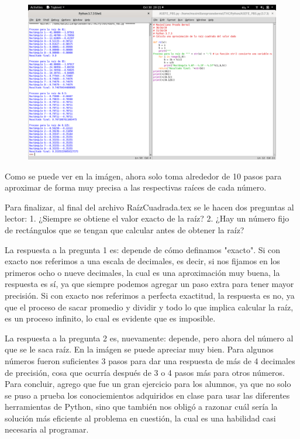 \documentclass[]{article}
\begin{document}
\begin{figure}[H]
	\centering
	\includegraphics[width=1.02\linewidth]{"Imagenes/Captura 7"}
	\caption{}
	\label{fig:captura-7}
\end{figure}
Como se puede ver en la imágen, ahora solo toma alrededor de 10 pasos para aproximar de forma muy precisa a las respectivas raíces de cada número.

Para finalizar, al final del archivo RaízCuadrada.tex se le hacen dos preguntas al lector: 1. ¿Siempre se obtiene el valor exacto de la raíz?
2. ¿Hay un número fijo de rectángulos que se tengan que calcular antes
de obtener la raíz?

La respuesta a la pregunta 1 es: depende de cómo definamos "exacto". Si con exacto nos referimos a una escala de decimales, es decir, si nos fijamos en los primeros ocho o nueve decimales, la cual es una aproximación muy buena, la respuesta es sí, ya que siempre podemos agregar un paso extra para tener mayor precisión. Si con exacto nos referimos a perfecta exactitud, la respuesta es no, ya que el proceso de sacar promedio y dividir y todo lo que implica calcular la raíz, es un proceso infinito, lo cual es evidente que es imposible.

La respuesta a la pregunta 2 es, nuevamente: depende, pero ahora del número al que se le saca raíz. En la imágen se puede apreciar muy bien. Para algunos números fueron suficientes 3 pasos para dar una respuesta de más de 4 decimales de precisión, cosa que ocurría después de 3 o 4 pasos más para otros números.
Para concluir, agrego que fue un gran ejercicio para los alumnos, ya que no solo se puso a prueba los conociemientos adquiridos en clase para usar las diferentes herramientas de Python, sino que también nos obligó a razonar cuál sería la solución más eficiente al problema en cuestión, la cual es una habilidad casi necesaria al programar.
\section{}
\end{document}
